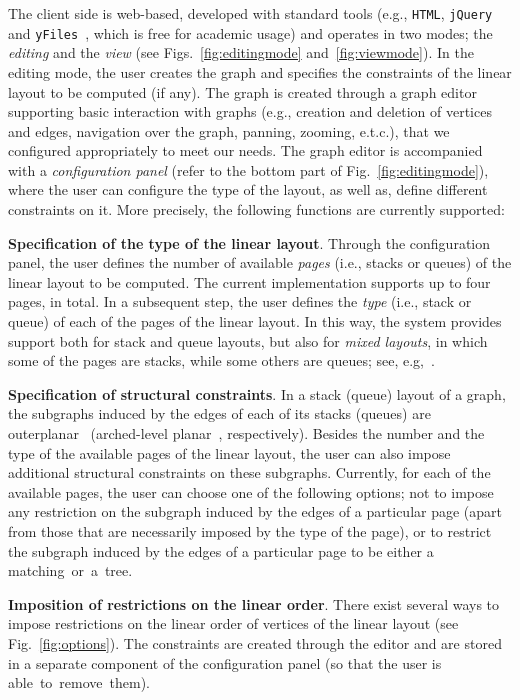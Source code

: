 \documentclass[runningheads]{llncs}
\newcommand{\myparagraph}[1]{\medskip\noindent\textbf{#1}.}
\begin{document}
The client side is web-based, developed with standard tools (e.g., \texttt{HTML}, \texttt{jQuery} and \texttt{yFiles}~\cite{DBLP:conf/gd/WieseEK00}, which is free for academic usage) and operates in two modes; the \emph{editing} and the \emph{view} (see Figs.~\ref{fig:editingmode} and~\ref{fig:viewmode}).  In the editing mode, the user creates the graph and specifies the constraints of the linear layout to be computed (if any). The graph is created through a graph editor supporting basic interaction with graphs (e.g., creation and deletion of vertices and edges, navigation over the graph, panning, zooming, e.t.c.), that we configured appropriately to meet our needs. The graph editor is accompanied with a \emph{configuration panel} (refer to the bottom part of Fig.~\ref{fig:editingmode}), where the user can configure the type of the layout, as well as, define different constraints on it. More precisely, the following functions are currently supported:

\myparagraph{Specification of the type of the linear layout} Through the configuration panel, the user defines the number of available \emph{pages} (i.e., stacks or queues) of the linear layout to be computed. The current implementation supports up to four pages, in total. In a subsequent step, the user defines the \emph{type} (i.e., stack or queue) of each of the pages of the linear layout. In this way, the system provides support both for stack and queue layouts, but also for \textit{mixed layouts}, in which some of the pages are stacks, while some others are queues; see, e.g,~\cite{DBLP:conf/gd/Pupyrev17}.

\myparagraph{Specification of structural constraints} In a stack (queue) layout of a graph, the subgraphs induced by the edges of each of its stacks (queues) are outerplanar~\cite{DBLP:journals/jct/BernhartK79} (arched-level planar~\cite{DBLP:journals/siamcomp/HeathR92}, respectively). 
%
Besides the number and the type of the available pages of the linear layout, the user can also impose additional structural constraints on these subgraphs. Currently, for each of the available pages, the user can choose one of the following options; not to impose any restriction on the subgraph induced by the edges of a particular page (apart from those that are necessarily imposed by the type of the page), or to restrict the subgraph induced by the edges of a particular page to be either a matching~or~a~tree.

\myparagraph{Imposition of restrictions on the linear order} There exist several ways to impose restrictions on the linear order of vertices of the linear layout (see Fig.~\ref{fig:options}). The constraints are created through the  editor and are stored in a separate component of the configuration panel (so that the user is able~to~remove~them). 
\end{document}
